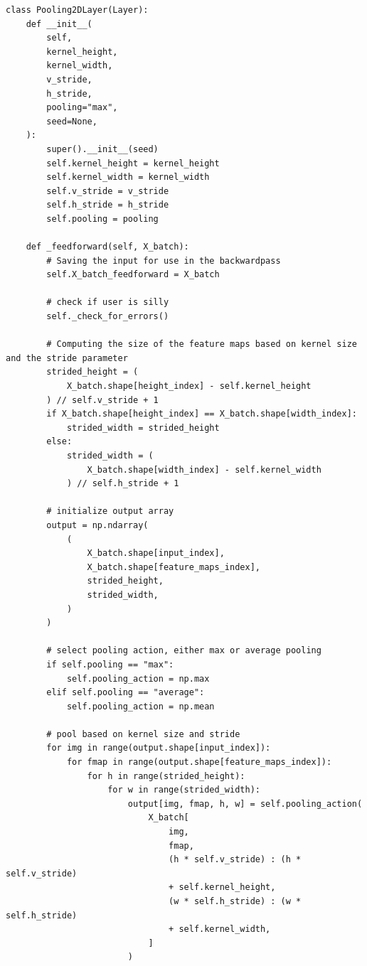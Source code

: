 \documentclass[%
oneside,                 %
final,                   %
10pt]{article}
\begin{document}
\begin{verbatim}
class Pooling2DLayer(Layer):
    def __init__(
        self,
        kernel_height,
        kernel_width,
        v_stride,
        h_stride,
        pooling="max",
        seed=None,
    ):
        super().__init__(seed)
        self.kernel_height = kernel_height
        self.kernel_width = kernel_width
        self.v_stride = v_stride
        self.h_stride = h_stride
        self.pooling = pooling

    def _feedforward(self, X_batch):
        # Saving the input for use in the backwardpass
        self.X_batch_feedforward = X_batch

        # check if user is silly
        self._check_for_errors()

        # Computing the size of the feature maps based on kernel size and the stride parameter
        strided_height = (
            X_batch.shape[height_index] - self.kernel_height
        ) // self.v_stride + 1
        if X_batch.shape[height_index] == X_batch.shape[width_index]:
            strided_width = strided_height
        else:
            strided_width = (
                X_batch.shape[width_index] - self.kernel_width
            ) // self.h_stride + 1

        # initialize output array
        output = np.ndarray(
            (
                X_batch.shape[input_index],
                X_batch.shape[feature_maps_index],
                strided_height,
                strided_width,
            )
        )

        # select pooling action, either max or average pooling
        if self.pooling == "max":
            self.pooling_action = np.max
        elif self.pooling == "average":
            self.pooling_action = np.mean

        # pool based on kernel size and stride
        for img in range(output.shape[input_index]):
            for fmap in range(output.shape[feature_maps_index]):
                for h in range(strided_height):
                    for w in range(strided_width):
                        output[img, fmap, h, w] = self.pooling_action(
                            X_batch[
                                img,
                                fmap,
                                (h * self.v_stride) : (h * self.v_stride)
                                + self.kernel_height,
                                (w * self.h_stride) : (w * self.h_stride)
                                + self.kernel_width,
                            ]
                        )


\end{verbatim}
\end{document}

